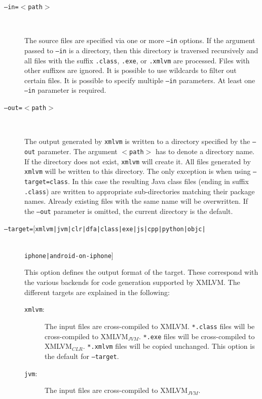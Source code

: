 \documentclass[11pt]{book}
\newcommand{\xmlvm}{\texttt{xmlvm} }
\begin{document}
\begin{description}

\item[\texttt{--in=$<$path$>$}] $ $

  The source files are specified via one or more \texttt{--in}
  options. If the argument passed to \texttt{--in} is a directory,
  then this directory is traversed recursively and all files with the
  suffix \texttt{.class}, \texttt{.exe}, or \texttt{.xmlvm} are
  processed. Files with other suffixes are ignored. It is possible to
  use wildcards to filter out certain files. It is possible to specify
  multiple \texttt{--in} parameters. At least one \texttt{--in}
  parameter is required.

\item[\texttt{--out=$<$path$>$}] $ $

  The output generated by \xmlvm is written to a directory specified
  by the \texttt{--out} parameter.  The argument \texttt{$<$path$>$}
  has to denote a directory name. If the directory does not exist,
  \xmlvm will create it. All files generated by \xmlvm will be written
  to this directory. The only exception is when using
  \texttt{--target=class}.  In this case the resulting Java class
  files (ending in suffix \texttt{.class}) are written to appropriate
  sub-directories matching their package names. Already existing files
  with the same name will be overwritten. If the \texttt{--out}
  parameter is omitted, the current directory is the default.

\item[\texttt{--target=$[$xmlvm|jvm|clr|dfa|class|exe|js|cpp|python|objc|}]
  $ $\\
  \texttt{iphone|android-on-iphone$]$}
  $ $

  This option defines the output format of the target. These
  correspond with the various backends for code generation supported
  by XMLVM. The different targets are explained in the following:

\begin{description}
\item[\texttt{xmlvm}:] The input files are cross-compiled to XMLVM.
  \texttt{*.class} files will be cross-compiled to XMLVM$_{JVM}$.
  \texttt{*.exe} files will be cross-compiled to XMLVM$_{CLR}$.
  \texttt{*.xmlvm} files will be copied unchanged. This option is the
  default for \texttt{--target}.

\item[\texttt{jvm}:] The input files are cross-compiled to
  XMLVM$_{JVM}$.


\end{description}
\end{description}
\end{document}
